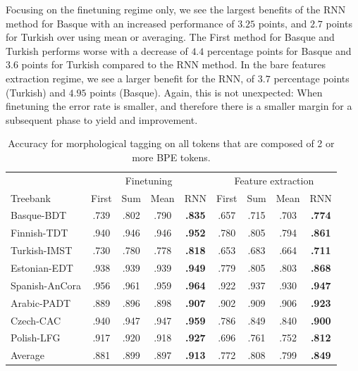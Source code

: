 \documentclass[11pt]{article}
\newcommand\jp[1]{(\textbf{JP:} #1)}
\begin{document}
                Focusing on the finetuning regime only, we see the
     largest benefits of the RNN method for Basque with an increased
     performance of $3.25$ points, and $2.7$ points for Turkish over
     using mean or averaging. The First method for Basque and Turkish
     performs worse with a decrease of $4.4$ percentage points
     for Basque and $3.6$ points for Turkish compared to the RNN method.
        In the bare features extraction regime, we see a larger
     benefit for the RNN, of $3.7$ percentage points (Turkish) and
     $4.95$ points (Basque). Again, this is not unexpected: When
     finetuning the error rate is smaller, and therefore there is a
     smaller margin for a subsequent phase to yield and improvement.
    

    
	\begin{table}%
	\centering
	\begin{tabular}{l|cccc|cccc}
		 & \multicolumn{4}{c}{Finetuning} & \multicolumn{4}{c}{Feature extraction} \\
		Treebank & First & Sum & Mean & RNN & First & Sum & Mean & RNN  \\
		 \hline
        Basque-BDT      & .739 & .802 & .790 & \textbf{.835} & .657 & .715 & .703 & \textbf{.774} \\
		Finnish-TDT     & .940 & .946 & .946 & \textbf{.952} & .780 & .805 & .794 & \textbf{.861} \\ 
		Turkish-IMST    & .730 & .780 & .778 & \textbf{.818} & .653 & .683 & .664 & \textbf{.711} \\
		Estonian-EDT    & .938 & .939 & .939 & \textbf{.949} & .779 & .805 & .803 & \textbf{.868} \\
		Spanish-AnCora  & .956 & .961 & .959 & \textbf{.964} & .922 & .937 & .930 & \textbf{.947} \\
		Arabic-PADT     & .889 & .896 & .898 & \textbf{.907} & .902 & .909 & .906 & \textbf{.923}\\
		Czech-CAC       & .940 & .947 & .947 & \textbf{.959} & .786 & .849 & .840 & \textbf{.900} \\
		Polish-LFG      & .917 & .920 & .918 & \textbf{.927} & .696 & .761 & .752 & \textbf{.812} \\
        \hline
        Average         & .881 & .899 & .897 & \textbf{.913} & .772 & .808 & .799 & \textbf{.849} \\
	\end{tabular}
    \caption{\label{tab:results_large_tokens} Accuracy for
     morphological tagging on all tokens that are composed of 2 or
     more BPE tokens.}
\end{table}
\end{document}
